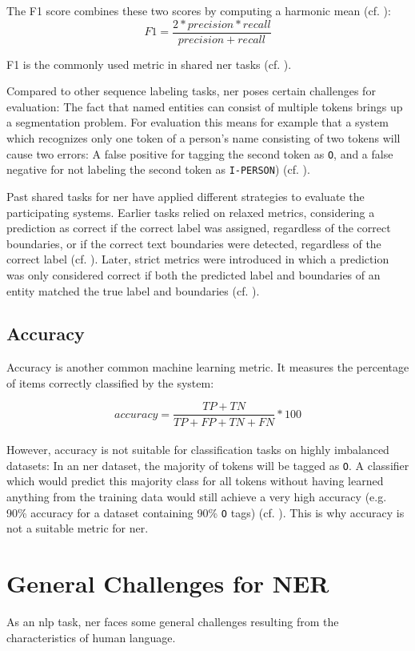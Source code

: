 The F1 score combines these two scores by computing a harmonic mean (cf. \cite[241]{zong_information_2021}):  
$$ F1 = \frac {2 * precision * recall} {precision + recall} $$

F1 is the commonly used metric in shared \gls{ner} tasks (cf. \cite[241]{zong_information_2021}).

Compared to other sequence labeling tasks, \gls{ner} poses certain challenges for evaluation: The fact that named entities can consist of multiple tokens brings up a segmentation problem. For evaluation this means for example that a system which recognizes only one token of a person's name consisting of two tokens will cause two errors: A false positive for tagging the second token as \verb|O|, and a false negative for not labeling the second token as \verb|I-PERSON|) (cf. \cite[167]{jurafsky_2021}). 

Past shared tasks for \gls{ner} have applied different strategies to evaluate the participating systems. Earlier tasks relied on relaxed metrics, considering a prediction as correct if the correct label was assigned, regardless of the correct boundaries, or if the correct text boundaries were detected, regardless of the correct label (cf. \cite{yadav_survey_2019}). Later, strict metrics were introduced in which a prediction was only considered correct if both the predicted label and boundaries of an entity matched the true label and boundaries (cf. \cite{yadav_survey_2019}).

\subsection{Accuracy}
Accuracy is another common machine learning metric. It measures the percentage of items correctly classified by the system: 

$$ accuracy = \frac {TP + TN} {TP + FP + TN + FN} *100 $$
\\
However, accuracy is not suitable for classification tasks on highly imbalanced datasets: In an \gls{ner} dataset, the majority of tokens will be tagged as \verb|O|. A classifier which would predict this majority class for all tokens without having learned anything from the training data would still achieve a very high accuracy (e.g. 90\% accuracy for a dataset containing 90\% \verb|O| tags) (cf. \cite[65-66]{jurafsky_2021}). This is why accuracy is not a suitable metric for \gls{ner}. 


\section{General Challenges for NER}
As an \gls{nlp} task, \gls{ner} faces some general challenges resulting from the characteristics of human language.

